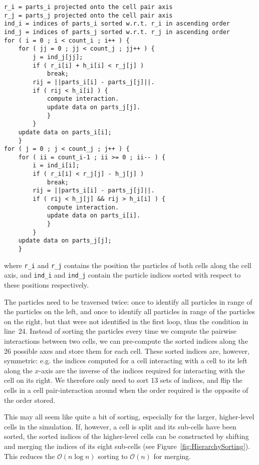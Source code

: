 \documentclass[final]{siamltex}
\newcommand{\oh}[1]
    {\mbox{$ {\mathcal O}( #1 ) $}}
\newcommand{\fig}[1]
    {Figure~\ref{fig:#1}}
\begin{document}
\begin{center}\begin{minipage}{0.8\textwidth}
    \begin{lstlisting}
r_i = parts_i projected onto the cell pair axis
r_j = parts_j projected onto the cell pair axis
ind_i = indices of parts_i sorted w.r.t. r_i in ascending order
ind_j = indices of parts_j sorted w.r.t. r_j in ascending order
for ( i = 0 ; i < count_i ; i++ ) {
    for ( jj = 0 ; jj < count_j ; jj++ ) {
        j = ind_j[jj];
        if ( r_i[i] + h_i[i] < r_j[j] )
            break;
        rij = ||parts_i[i] - parts_j[j]||.
        if ( rij < h_i[i] ) {
            compute interaction.
            update data on parts_j[j].
            }
        }
    update data on parts_i[i];
    }
for ( j = 0 ; j < count_j ; j++ ) {
    for ( ii = count_i-1 ; ii >= 0 ; ii-- ) {
        i = ind_i[i];
        if ( r_i[i] < r_j[j] - h_j[j] )
            break;
        rij = ||parts_i[i] - parts_j[j]||.
        if ( rij < h_j[j] && rij > h_i[i] ) {
            compute interaction.
            update data on parts_i[i].
            }
        }
    update data on parts_j[j];
    }
    \end{lstlisting}
\end{minipage}\end{center}
        
\noindent where {\tt r\_i} and {\tt r\_j} contains the position
the particles of both cells along the cell axis, and
{\tt ind\_i} and {\tt ind\_j} contain the particle indices
sorted with respect to these positions respectively.

The particles need to be traversed twice: once to identify
all particles in range of the particles on the left, and
once to identify all particles in range of the particles on the
right, but that were not identified in the first loop,
thus the condition in line~24.
Instead of sorting the particles every time we compute the
pairwise interactions between two cells, we can pre-compute
the sorted indices along the 26 possible axes and store them
for each cell.
These sorted indices are, however, symmetric: e.g. the indices
computed for a cell interacting with a cell to its left along the
$x$-axis are the inverse of the indices required for interacting 
with the cell on its right.
We therefore only need to sort 13 sets of indices, and flip
the cells in a cell pair-interaction around when the order
required is the opposite of the order stored.

This may all seem like quite a bit of sorting, especially
for the larger, higher-level cells in the simulation.
If, however, a cell is split and its sub-cells have been sorted,
the sorted indices of the higher-level cells can be constructed
by shifting and merging the indices of its eight sub-cells
(see \fig{HierarchySorting}).
This reduces the \oh{n\log{n}} sorting to \oh{n} for merging. 
\end{document}
